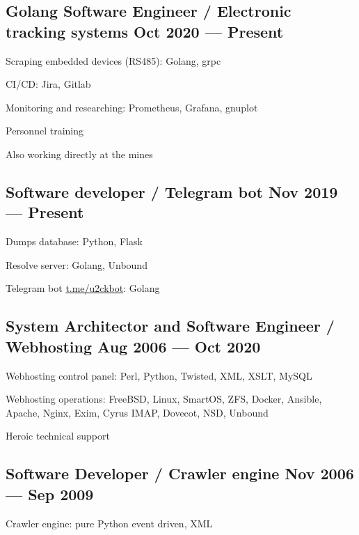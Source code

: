 \documentclass[letter,10pt]{article}
\begin{document}
\subsection{{Golang Software Engineer / Electronic tracking systems \hfill Oct 2020 --- Present}}
\begin{zitemize}
\item Scraping embedded devices (RS485): Golang, grpc
\item CI/CD: Jira, Gitlab
\item Monitoring and researching: Prometheus, Grafana, gnuplot
\item Personnel training
\item Also working directly at the mines
\end{zitemize}

\subsection{{Software developer / Telegram bot \hfill Nov 2019 --- Present}}
\begin{zitemize}
\item Dumps database: Python, Flask
\item Resolve server: Golang, Unbound
\item Telegram bot \href{https://t.me/u2ckbot}{t.me/u2ckbot}: Golang
\end{zitemize}

\subsection{{System Architector and Software Engineer / Webhosting \hfill Aug 2006 --- Oct 2020}}
\begin{zitemize}
\item Webhosting control panel: Perl, Python, Twisted, XML, XSLT, MySQL
\item Webhosting operations: FreeBSD, Linux, SmartOS, ZFS, Docker, Ansible, Apache, Nginx, Exim, Cyrus IMAP, Dovecot, NSD, Unbound
\item Heroic technical support
\end{zitemize}

\subsection{{Software Developer / Crawler engine \hfill Nov 2006 --- Sep 2009}}
\begin{zitemize}
\item Crawler engine: pure Python event driven, XML
\end{zitemize}
\end{document}
